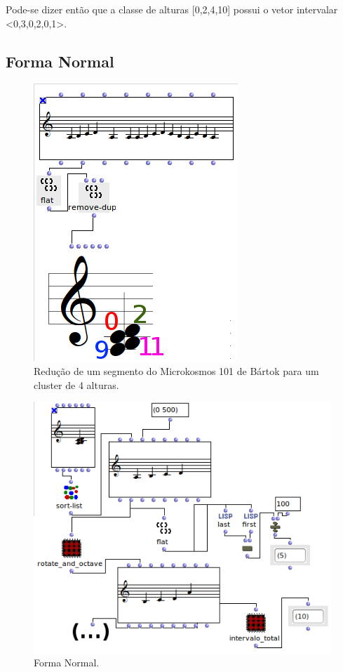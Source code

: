 \documentclass[
	12pt,				%
	openright,			%
	twoside,			%
	a4paper,			%
	english,			%
	french,				%
	spanish,			%
	brazil				%
	]{abntex2}
\begin{document}
Pode-se dizer então que a classe de alturas [0,2,4,10] possui o vetor intervalar <0,3,0,2,0,1>.

\pagebreak
\subsection{Forma Normal} 

\begin{figure}[h]
	\caption{\label{fig_grafico}Redução de um segmento do Microkosmos 101 de Bártok para um cluster de 4 alturas. }
	\begin{center}
	    \includegraphics[scale=0.7]{OM_settheory/reducao_acorde.png}
	\end{center}
\end{figure}



\begin{figure}[h]
	\caption{\label{fig_grafico}Forma Normal. }
	\begin{center}
	    \includegraphics[scale=0.7]{OM_settheory/forma_normal.png}
	\end{center}
\end{figure}
\end{document}
